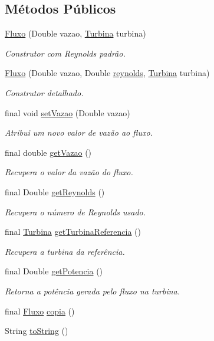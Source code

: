 \subsection*{Métodos Públicos}
\begin{DoxyCompactItemize}
\item 
\hyperlink{classusina_1_1_fluxo_ab85463cd78cac200be698b91c6be1141}{Fluxo} (Double vazao, \hyperlink{classusina_1_1_turbina}{Turbina} turbina)
\begin{DoxyCompactList}\small\item\em Construtor com Reynolds padrão. \end{DoxyCompactList}\item 
\hyperlink{classusina_1_1_fluxo_a8959019b735089b6cbb96107ba3929b9}{Fluxo} (Double vazao, Double \hyperlink{classusina_1_1_fluxo_a185fed046eefce4fa8f8bb10fde8296d}{reynolds}, \hyperlink{classusina_1_1_turbina}{Turbina} turbina)
\begin{DoxyCompactList}\small\item\em Construtor detalhado. \end{DoxyCompactList}\item 
final void \hyperlink{classusina_1_1_fluxo_af80f13f4ade8128bac424b456ec0836a}{set\-Vazao} (Double vazao)
\begin{DoxyCompactList}\small\item\em Atribui um novo valor de vazão ao fluxo. \end{DoxyCompactList}\item 
final double \hyperlink{classusina_1_1_fluxo_a0634c81d7575ad63274828d8c40a88e5}{get\-Vazao} ()
\begin{DoxyCompactList}\small\item\em Recupera o valor da vazão do fluxo. \end{DoxyCompactList}\item 
final Double \hyperlink{classusina_1_1_fluxo_a110ca81bcee4d7f8f08298b3b9372d21}{get\-Reynolds} ()
\begin{DoxyCompactList}\small\item\em Recupera o número de Reynolds usado. \end{DoxyCompactList}\item 
final \hyperlink{classusina_1_1_turbina}{Turbina} \hyperlink{classusina_1_1_fluxo_a61cc464f6926c453c51fcded2d57306d}{get\-Turbina\-Referencia} ()
\begin{DoxyCompactList}\small\item\em Recupera a turbina da referência. \end{DoxyCompactList}\item 
final Double \hyperlink{classusina_1_1_fluxo_a767621d68cb2ceb8dbbd03bacba8cba5}{get\-Potencia} ()
\begin{DoxyCompactList}\small\item\em Retorna a potência gerada pelo fluxo na turbina. \end{DoxyCompactList}\item 
final \hyperlink{classusina_1_1_fluxo}{Fluxo} \hyperlink{classusina_1_1_fluxo_a9749f0c9449677337f81f1f193d4f564}{copia} ()
\item 
String \hyperlink{classusina_1_1_fluxo_aa7c07414a1af3c807312950fa5019591}{to\-String} ()
\end{DoxyCompactItemize}
